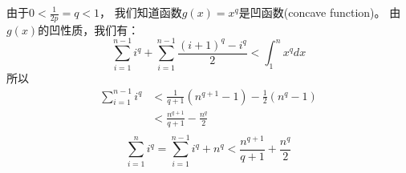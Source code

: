  由于$0<\frac{1}{2p}=q<1$， 我们知道函数$g(x)=x^q$是凹函数(concave function)。 由$g(x)$的凹性质，我们有：
 \begin{equation}
 \sum_{i=1}^{n-1}i^q+\sum_{i=1}^{n-1}\frac{(i+1)^q-i^q}{2}<\int_1^{n}x^qdx
 \end{equation}
 所以
 \begin{equation}
 \begin{split}
 \sum_{i=1}^{n-1}i^q
 &<\frac{1}{q+1}(n^{q+1}-1)-\frac{1}{2}(n^q-1)\\
 &<\frac{n^{q+1}}{q+1}-\frac{n^q}{2}\\
 \end{split}
 \end{equation}
 \begin{equation}
 \sum_{i=1}^{n}i^q=\sum_{i=1}^{n-1}i^q+n^q<\frac{n^{q+1}}{q+1}+\frac{n^q}{2}
 \end{equation}

